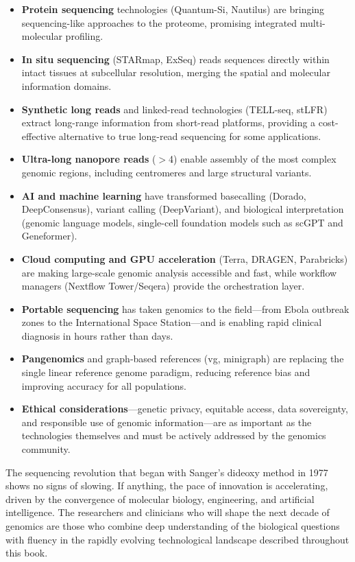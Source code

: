 \begin{itemize}[itemsep=3pt]
  \item \textbf{Protein sequencing} technologies (Quantum-Si, Nautilus) are bringing sequencing-like approaches to the proteome, promising integrated multi-molecular profiling.
  \item \textbf{In situ sequencing} (STARmap, ExSeq) reads sequences directly within intact tissues at subcellular resolution, merging the spatial and molecular information domains.
  \item \textbf{Synthetic long reads} and linked-read technologies (TELL-seq, stLFR) extract long-range information from short-read platforms, providing a cost-effective alternative to true long-read sequencing for some applications.
  \item \textbf{Ultra-long nanopore reads} ($>$4\megabase{}) enable assembly of the most complex genomic regions, including centromeres and large structural variants.
  \item \textbf{AI and machine learning} have transformed basecalling (Dorado, DeepConsensus), variant calling (DeepVariant), and biological interpretation (genomic language models, single-cell foundation models such as scGPT and Geneformer).
  \item \textbf{Cloud computing and GPU acceleration} (Terra, DRAGEN, Parabricks) are making large-scale genomic analysis accessible and fast, while workflow managers (Nextflow Tower/Seqera) provide the orchestration layer.
  \item \textbf{Portable sequencing} has taken genomics to the field---from Ebola outbreak zones to the International Space Station---and is enabling rapid clinical diagnosis in hours rather than days.
  \item \textbf{Pangenomics} and graph-based references (vg, minigraph) are replacing the single linear reference genome paradigm, reducing reference bias and improving accuracy for all populations.
  \item \textbf{Ethical considerations}---genetic privacy, equitable access, data sovereignty, and responsible use of genomic information---are as important as the technologies themselves and must be actively addressed by the genomics community.
\end{itemize}

The sequencing revolution that began with Sanger's dideoxy method in 1977 shows no signs of slowing. If anything, the pace of innovation is accelerating, driven by the convergence of molecular biology, engineering, and artificial intelligence. The researchers and clinicians who will shape the next decade of genomics are those who combine deep understanding of the biological questions with fluency in the rapidly evolving technological landscape described throughout this book.
